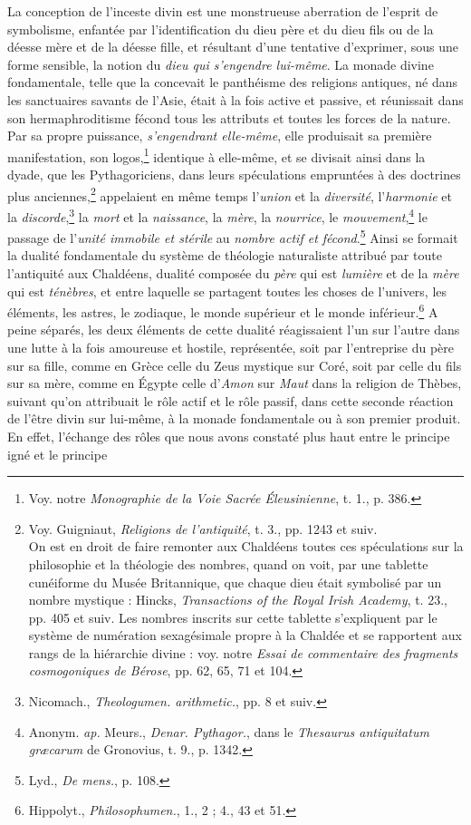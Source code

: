 \documentclass[a4paper, 11pt, oneside]{article}
\begin{document}
La conception de l'inceste divin est une monstrueuse aberration de l'esprit de symbolisme, enfantée par l'identification du dieu père et du dieu fils ou de la déesse mère et de la déesse fille, et résultant d'une tentative d'exprimer, sous une forme sensible, la notion du \emph{dieu qui s'engendre lui-même}. La monade divine fondamentale, telle que la concevait le panthéisme des religions antiques, né dans les sanctuaires savants de l'Asie, était à la fois active et passive, et réunissait dans son hermaphroditisme fécond tous les attributs et toutes les forces de la nature. Par sa propre puissance, \emph{s'engendrant elle-même}, elle produisait sa première manifestation, son logos,\footnote{Voy. notre \emph{Monographie de la Voie Sacrée Éleusinienne}, t. 1., p. 386.} identique à elle-même, et se divisait ainsi dans la dyade, que les Pythagoriciens, dans leurs spéculations empruntées à des doctrines plus anciennes,\footnote{Voy. Guigniaut, \emph{Religions de l'antiquité}, t. 3., pp. 1243 et suiv.\\\hspace*{5mm}On est en droit de faire remonter aux Chaldéens toutes ces spéculations sur la philosophie et la théologie des nombres, quand on voit, par une tablette cunéiforme du Musée Britannique, que chaque dieu était symbolisé par un nombre mystique : Hincks, \emph{Transactions of the Royal Irish Academy}, t. 23., pp. 405 et suiv. Les nombres inscrits sur cette tablette s'expliquent par le système de numération sexagésimale propre à la Chaldée et se rapportent aux rangs de la hiérarchie divine : voy. notre \emph{Essai de commentaire des fragments cosmogoniques de Bérose}, pp. 62, 65, 71 et 104.} appelaient en même temps l'\emph{union} et la \emph{diversité}, l'\emph{harmonie} et la \emph{discorde},\footnote{Nicomach., \emph{Theologumen. arithmetic.}, pp. 8 et suiv.} la \emph{mort} et la \emph{naissance}, la \emph{mère}, la \emph{nourrice}, le \emph{mouvement},\footnote{Anonym. \emph{ap.} Meurs., \emph{Denar. Pythagor.}, dans le \emph{Thesaurus antiquitatum græcarum} de Gronovius, t. 9., p. 1342.} le passage de l'\emph{unité immobile et stérile} au \emph{nombre actif et fécond}.\footnote{Lyd., \emph{De mens.}, p. 108.} Ainsi se formait la dualité fondamentale du système de théologie naturaliste attribué par toute l'antiquité aux Chaldéens, dualité composée du \emph{père} qui est \emph{lumière} et de la \emph{mère} qui est \emph{ténèbres}, et entre laquelle se partagent toutes les choses de l'univers, les éléments, les astres, le zodiaque, le monde supérieur et le monde inférieur.\footnote{Hippolyt., \emph{Philosophumen.}, 1., 2 ; 4., 43 et 51.} A peine séparés, les deux éléments de cette dualité réagissaient l'un sur l'autre dans une lutte à la fois amoureuse et hostile, représentée, soit par l'entreprise du père sur sa fille, comme en Grèce celle du Zeus mystique sur Coré, soit par celle du fils sur sa mère, comme en Égypte celle d'\emph{Amon} sur \emph{Maut} dans la religion de Thèbes, suivant qu'on attribuait le rôle actif et le rôle passif, dans cette seconde réaction de l'être divin sur lui-même, à la monade fondamentale ou à son premier produit. En effet, l'échange des rôles que nous avons constaté plus haut entre le principe igné et le principe 
\end{document}
